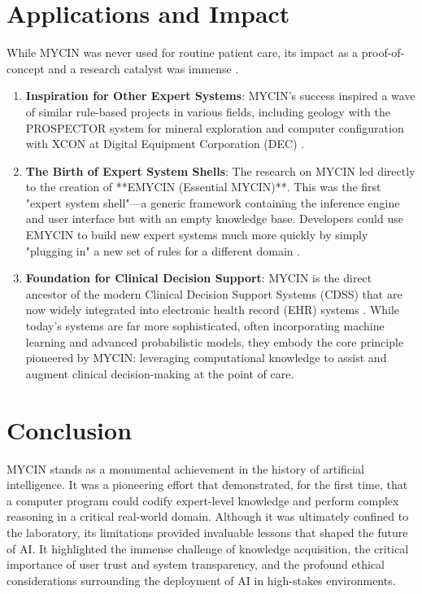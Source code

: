 \documentclass[conference]{IEEEtran}
\begin{document}
\section{Applications and Impact}
While MYCIN was never used for routine patient care, its impact as a proof-of-concept and a research catalyst was immense \cite{b7}.
\begin{enumerate}
    \item \textbf{Inspiration for Other Expert Systems}: MYCIN's success inspired a wave of similar rule-based projects in various fields, including geology with the PROSPECTOR system for mineral exploration and computer configuration with XCON at Digital Equipment Corporation (DEC) \cite{b31}.
    \item \textbf{The Birth of Expert System Shells}: The research on MYCIN led directly to the creation of **EMYCIN (Essential MYCIN)**. This was the first "expert system shell"—a generic framework containing the inference engine and user interface but with an empty knowledge base. Developers could use EMYCIN to build new expert systems much more quickly by simply "plugging in" a new set of rules for a different domain \cite{b18}.
    \item \textbf{Foundation for Clinical Decision Support}: MYCIN is the direct ancestor of the modern Clinical Decision Support Systems (CDSS) that are now widely integrated into electronic health record (EHR) systems \cite{b21}. While today's systems are far more sophisticated, often incorporating machine learning and advanced probabilistic models, they embody the core principle pioneered by MYCIN: leveraging computational knowledge to assist and augment clinical decision-making at the point of care.
\end{enumerate}

\section{Conclusion}
MYCIN stands as a monumental achievement in the history of artificial intelligence. It was a pioneering effort that demonstrated, for the first time, that a computer program could codify expert-level knowledge and perform complex reasoning in a critical real-world domain. Although it was ultimately confined to the laboratory, its limitations provided invaluable lessons that shaped the future of AI. It highlighted the immense challenge of knowledge acquisition, the critical importance of user trust and system transparency, and the profound ethical considerations surrounding the deployment of AI in high-stakes environments.
\end{document}
